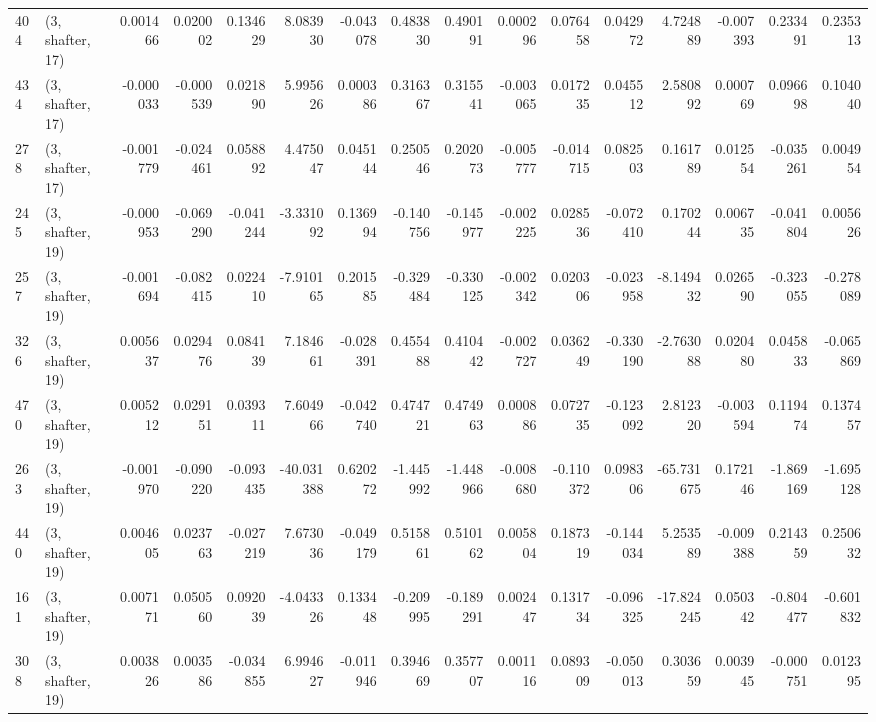 \begin{tabular}{llrrrrrrrrrrrrrr}
404 &  (3, shafter, 17) &   0.001466 &  0.020002 &  0.134629 &    8.083930 & -0.043078 &   0.483830 &  0.490191 &  0.000296 &  0.076458 &  0.042972 &     4.724889 & -0.007393 &  0.233491 &  0.235313 \\
434 &  (3, shafter, 17) &  -0.000033 & -0.000539 &  0.021890 &    5.995626 &  0.000386 &   0.316367 &  0.315541 & -0.003065 &  0.017235 &  0.045512 &     2.580892 &  0.000769 &  0.096698 &  0.104040 \\
278 &  (3, shafter, 17) &  -0.001779 & -0.024461 &  0.058892 &    4.475047 &  0.045144 &   0.250546 &  0.202073 & -0.005777 & -0.014715 &  0.082503 &     0.161789 &  0.012554 & -0.035261 &  0.004954 \\
245 &  (3, shafter, 19) &  -0.000953 & -0.069290 & -0.041244 &   -3.331092 &  0.136994 &  -0.140756 & -0.145977 & -0.002225 &  0.028536 & -0.072410 &     0.170244 &  0.006735 & -0.041804 &  0.005626 \\
257 &  (3, shafter, 19) &  -0.001694 & -0.082415 &  0.022410 &   -7.910165 &  0.201585 &  -0.329484 & -0.330125 & -0.002342 &  0.020306 & -0.023958 &    -8.149432 &  0.026590 & -0.323055 & -0.278089 \\
326 &  (3, shafter, 19) &   0.005637 &  0.029476 &  0.084139 &    7.184661 & -0.028391 &   0.455488 &  0.410442 & -0.002727 &  0.036249 & -0.330190 &    -2.763088 &  0.020480 &  0.045833 & -0.065869 \\
470 &  (3, shafter, 19) &   0.005212 &  0.029151 &  0.039311 &    7.604966 & -0.042740 &   0.474721 &  0.474963 &  0.000886 &  0.072735 & -0.123092 &     2.812320 & -0.003594 &  0.119474 &  0.137457 \\
263 &  (3, shafter, 19) &  -0.001970 & -0.090220 & -0.093435 &  -40.031388 &  0.620272 &  -1.445992 & -1.448966 & -0.008680 & -0.110372 &  0.098306 &   -65.731675 &  0.172146 & -1.869169 & -1.695128 \\
440 &  (3, shafter, 19) &   0.004605 &  0.023763 & -0.027219 &    7.673036 & -0.049179 &   0.515861 &  0.510162 &  0.005804 &  0.187319 & -0.144034 &     5.253589 & -0.009388 &  0.214359 &  0.250632 \\
161 &  (3, shafter, 19) &   0.007171 &  0.050560 &  0.092039 &   -4.043326 &  0.133448 &  -0.209995 & -0.189291 &  0.002447 &  0.131734 & -0.096325 &   -17.824245 &  0.050342 & -0.804477 & -0.601832 \\
308 &  (3, shafter, 19) &   0.003826 &  0.003586 & -0.034855 &    6.994627 & -0.011946 &   0.394669 &  0.357707 &  0.001116 &  0.089309 & -0.050013 &     0.303659 &  0.003945 & -0.000751 &  0.012395 \\

\end{tabular}
